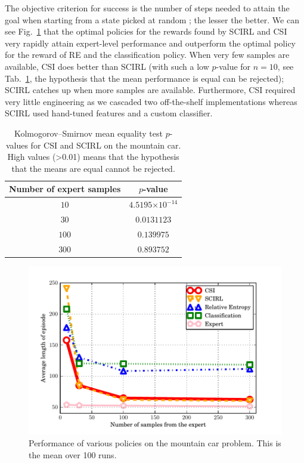\documentclass[smallextended]{svjour3}
\providecommand{\e}[1]{\ensuremath{\times 10^{#1}}}
\begin{document}
The objective criterion for success is the number of steps needed to attain the goal when starting from a state picked at random ; the lesser the better. We can see Fig.~\ref{fig:MountainCar} that the optimal policies for the rewards found by SCIRL and CSI very rapidly attain expert-level performance and outperform the optimal policy for the reward of RE and the classification policy. When very few samples are available, CSI does better than SCIRL (with such a low $p$-value for $n=10$, see Tab.~\ref{tab:mc}, the hypothesis that the mean performance is equal can be rejected); SCIRL catches up when more samples are available. Furthermore, CSI required very little engineering as we cascaded two off-the-shelf implementations whereas SCIRL used hand-tuned features and a custom classifier.
\begin{table}
	\begin{center}
		\begin{tabular}{cc}
		\toprule
			Number of expert samples & $p$-value\\
			\midrule
			$10$ & $4.5195\e{-14}$\\
			$30$ & $0.0131123$\\
			$100$ & $0.139975$\\
			$300$ & $0.893752$\\
		\bottomrule
		\end{tabular}
	\end{center}
        \caption{Kolmogorov–Smirnov mean equality test $p$-values for CSI and SCIRL on the mountain car. High values (>0.01) means that the hypothesis that the means are equal cannot be rejected.}
        \label{tab:mc}
\end{table}
\begin{figure}
  \includegraphics[width=\textwidth]{Exp11.pdf}
  \caption{Performance of various policies on the mountain car problem. This is the mean over 100 runs.}
  \label{fig:MountainCar}
\end{figure}
\end{document}
